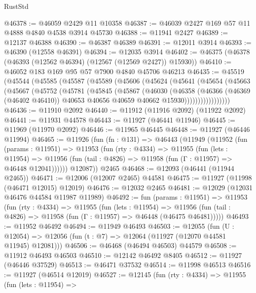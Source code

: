 \begin{lexlean}{RustStd}
\begin{coremodule}
@46378 := @46059 @2429 @11 @10358
@46387 := @46039 @2427 @169 @57 @11 @4888 @4840 @4538 @3914 @45730
@46388 := @11941 @2427
@46389 := @12137 @46388
@46390 := @46387 @46389
@46391 := @12011 @3914
@46393 := @46390 (@12558 @46391)
@46394 := @12035 @3914
@46402 := @46375 (@46378 (@46393 (@12562 @46394) (@12567 (@12569 @2427)) @15930))
@46410 := @46052 @183 @169 @95 @57 @7900 @4840 @45706 @46213
@46435 := @45519
    (@45544
      (@45585
        (@45587
          (@45589
            (@45606
              (@45624
                (@45641
                  (@45654
                    (@45663
                      (@45667
                        (@45752
                          (@45781
                            (@45845
                              (@45867
                                (@46030
                                  (@46358
                                    (@46366
                                      (@46369 (@46402 @46410))
                                      @40653
                                      @40656
                                      @40659
                                      @40662
                                      @15930)))))))))))))))))
@46436 := @11910 @2092
@46440 := @11912 (@11916 @2092) (@11922 @2092)
@46441 := @11931 @44578
@46443 := @11927 (@46441 @11946)
@46445 := @11969 (@11970 @2092)
@46446 := @11965 @46445
@46448 := @11927 (@46446 @11994)
@46465 := @11926
    (fun (fn : @131) =>
    @46443
      (@11949
        (@11952
          (fun (params : @11951) =>
          @11953
            (fun (rty : @4334) =>
            @11955
              (fun (lets : @11954) =>
              @11956 (fun (tail : @4826) => @11958 (fun (Γ : @11957) => @46448 @12041))))))
        @12087))
    @2465
@46468 := @12093 (@46441 (@11944 @2465))
@46471 := @12006 (@12007 @2465) @44581
@46475 := @11927 (@11998 (@46471 @12015) @12019)
@46476 := @12032 @2465
@46481 := @12029 (@12031 @46476 @44584 @11987 @11989)
@46492 := fun (params : @11951) =>
  @11953
    (fun (rty : @4334) =>
    @11955
      (fun (lets : @11954) =>
      @11956 (fun (tail : @4826) => @11958 (fun (Γ : @11957) => @46448 (@46475 @46481)))))
@46493 := @11952 @46492
@46494 := @11949 @46493
@46503 := @12055
    (fun (U : @12054) => @12056 (fun (t : @7) => @12064 (@11927 (@12070 @44581 @11945) @12081)))
@46506 := @46468 (@46494 @46503) @44579
@46508 := @11912 @46493 @46503
@46510 := @12142 @46492 @8405
@46512 := @11927 (@46446 @37529)
@46513 := @46471 @37532
@46514 := @11998 @46513
@46516 := @11927 (@46514 @12019)
@46527 := @12145
    (fun (rty : @4334) =>
    @11955
      (fun (lets : @11954) =>

\end{coremodule}
\end{lexlean}
